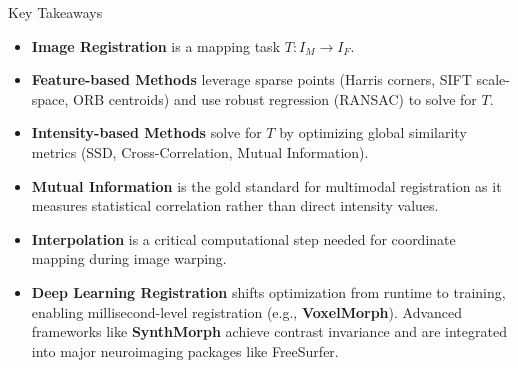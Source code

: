 \documentclass[aspectratio=169,10pt]{beamer}
\begin{document}
\begin{frame}{Key Takeaways}
\begin{itemize}
    \item \textbf{Image Registration} is a mapping task $T: I_M \to I_F$.
    \item \textbf{Feature-based Methods} leverage sparse points (Harris corners, SIFT scale-space, ORB centroids) and use robust regression (RANSAC) to solve for $T$.
    \item \textbf{Intensity-based Methods} solve for $T$ by optimizing global similarity metrics (SSD, Cross-Correlation, Mutual Information).
    \item \textbf{Mutual Information} is the gold standard for multimodal registration as it measures statistical correlation rather than direct intensity values.
    \item \textbf{Interpolation} is a critical computational step needed for coordinate mapping during image warping.
    \item \textbf{Deep Learning Registration} shifts optimization from runtime to training, enabling millisecond-level registration (e.g., \textbf{VoxelMorph}). Advanced frameworks like \textbf{SynthMorph} achieve contrast invariance and are integrated into major neuroimaging packages like FreeSurfer.
\end{itemize}
\end{frame}
\end{document}
